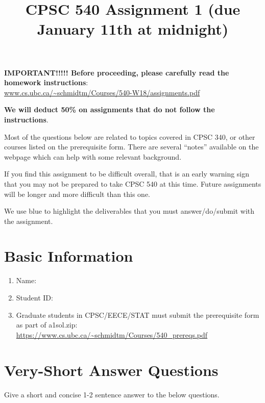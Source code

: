 \documentclass{article}
\def\blu#1{{\color{blu}#1}}
\def\enum#1{\begin{enumerate}#1\end{enumerate}}
\begin{document}
\title{CPSC 540 Assignment 1 (due January 11th at midnight)}
\author{}
\date{}
\maketitle
\vspace{-4em}

\textbf{IMPORTANT!!!!! Before proceeding, please carefully read the homework instructions}:\\ \url{www.cs.ubc.ca/~schmidtm/Courses/540-W18/assignments.pdf}

\textbf{We will deduct 50\% on assignments that do not follow the instructions}.

Most of the questions below are related to topics covered in CPSC 340, or other courses listed on the prerequisite form. There are several ``notes'' available on the webpage which can help with some relevant background.

If you find this assignment to be difficult overall, that is an early warning sign that you may not be prepared to take CPSC 540
at this time. Future assignments will be longer and more difficult than this one.

We use \blu{blue} to highlight the deliverables that you must answer/do/submit with the assignment.

\section*{Basic Information}


\blu{\enum{
\item Name:
\item Student ID:
\item Graduate students in CPSC/EECE/STAT must submit the prerequisite form as part of a1sol.zip:\\
\url{https://www.cs.ubc.ca/~schmidtm/Courses/540_prereqs.pdf}
}}


\section{Very-Short Answer Questions}


Give a short and concise 1-2 sentence answer to the below questions.
\end{document}
